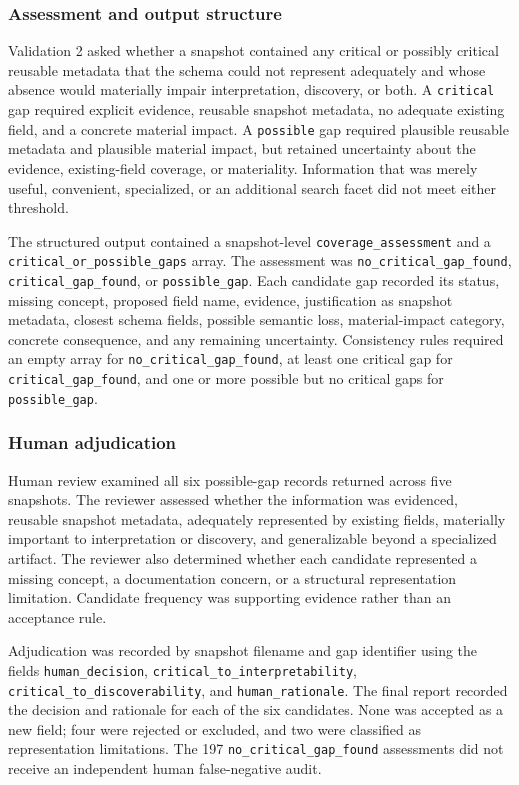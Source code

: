 \documentclass{article}
\begin{document}
\subsubsection{Assessment and output structure}

Validation 2 asked whether a snapshot contained any critical or possibly critical reusable metadata that the schema could not represent adequately and whose absence would materially impair interpretation, discovery, or both. A \texttt{critical} gap required explicit evidence, reusable snapshot metadata, no adequate existing field, and a concrete material impact. A \texttt{possible} gap required plausible reusable metadata and plausible material impact, but retained uncertainty about the evidence, existing-field coverage, or materiality. Information that was merely useful, convenient, specialized, or an additional search facet did not meet either threshold.

The structured output contained a snapshot-level \texttt{coverage\_assessment} and a \texttt{critical\_or\_possible\_gaps} array. The assessment was \texttt{no\_critical\_gap\_found}, \texttt{critical\_gap\_found}, or \texttt{possible\_gap}. Each candidate gap recorded its status, missing concept, proposed field name, evidence, justification as snapshot metadata, closest schema fields, possible semantic loss, material-impact category, concrete consequence, and any remaining uncertainty. Consistency rules required an empty array for \texttt{no\_critical\_gap\_found}, at least one critical gap for \texttt{critical\_gap\_found}, and one or more possible but no critical gaps for \texttt{possible\_gap}.

\subsubsection{Human adjudication}

Human review examined all six possible-gap records returned across five snapshots. The reviewer assessed whether the information was evidenced, reusable snapshot metadata, adequately represented by existing fields, materially important to interpretation or discovery, and generalizable beyond a specialized artifact. The reviewer also determined whether each candidate represented a missing concept, a documentation concern, or a structural representation limitation. Candidate frequency was supporting evidence rather than an acceptance rule.

Adjudication was recorded by snapshot filename and gap identifier using the fields \texttt{human\_decision}, \texttt{critical\_to\_interpretability}, \texttt{critical\_to\_discoverability}, and \texttt{human\_rationale}. The final report recorded the decision and rationale for each of the six candidates. None was accepted as a new field; four were rejected or excluded, and two were classified as representation limitations. The 197 \texttt{no\_critical\_gap\_found} assessments did not receive an independent human false-negative audit.
\end{document}
